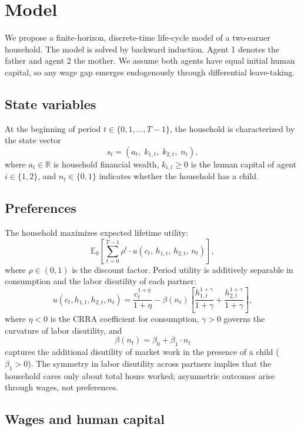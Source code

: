 \section{Model}

We propose a finite-horizon, discrete-time life-cycle model of a two-earner household. The model is solved by backward induction. Agent 1 denotes the father and agent 2 the mother. We assume both agents have equal initial human capital, so any wage gap emerges endogenously through differential leave-taking.

\subsection{State variables}

At the beginning of period $t \in \{0, 1, \ldots, T-1\}$, the household is characterized by the state vector
\[
    s_t = (a_t,\; k_{1,t},\; k_{2,t},\; n_t),
\]
where $a_t \in \mathbb{R}$ is household financial wealth, $k_{i,t} \geq 0$ is the human capital of agent $i \in \{1,2\}$, and $n_t \in \{0, 1\}$ indicates whether the household has a child.

\subsection{Preferences}

The household maximizes expected lifetime utility:
\[
    \mathbb{E}_0 \left[ \sum_{t=0}^{T-1} \rho^t \cdot u(c_t,\, h_{1,t},\, h_{2,t},\, n_t) \right],
\]
where $\rho \in (0,1)$ is the discount factor. Period utility is additively separable in consumption and the labor disutility of each partner:
\begin{equation}
    u(c_t, h_{1,t}, h_{2,t}, n_t) = \frac{c_t^{1+\eta}}{1+\eta} - \beta(n_t)\left[\frac{h_{1,t}^{1+\gamma}}{1+\gamma} + \frac{h_{2,t}^{1+\gamma}}{1+\gamma}\right],
    \label{eq:utility}
\end{equation}
where $\eta < 0$ is the CRRA coefficient for consumption, $\gamma > 0$ governs the curvature of labor disutility, and
\[
    \beta(n_t) = \beta_0 + \beta_1 \cdot n_t
\]
captures the additional disutility of market work in the presence of a child ($\beta_1 > 0$). The symmetry in labor disutility across partners implies that the household cares only about total hours worked; asymmetric outcomes arise through wages, not preferences.

\subsection{Wages and human capital}

